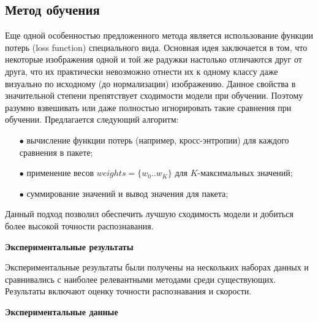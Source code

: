 \subsection{Метод обучения}

Еще одной особенностью предложенного метода является использование функции потерь (loss function) специального вида. Основная идея заключается в том, что некоторые изображения одной и той же радужки настолько отличаются друг от друга, что их практически невозможно отнести их к одному классу даже визуально по исходному (до нормализации) изображению. Данное свойства в значительной степени препятствует сходимости модели при обучении. Поэтому разумно взвешивать или даже полностью игнорировать такие сравнения при обучении. Предлагается следующий алгоритм:

\begin{enumerate}
	\item[$\bullet$] вычисление функции потерь (например, кросс-энтропии) для каждого сравнения в пакете;
	\item[$\bullet$] применение весов $weights=\lbrace{w_0..w_K}\rbrace$ для $K$-максимальных значений;
	\item[$\bullet$] суммирование значений и вывод значения для пакета;
\end{enumerate}

Данный подход позволил обеспечить лучшую сходимость модели и добиться более высокой точности распознавания.

{\bf Экспериментальные результаты}
\label{sec:fem-nn-exp-results}

Экспериментальные результаты были получены на нескольких наборах данных и сравнивались с наиболее релевантными методами среди существующих. Результаты включают оценку точности распознавания и скорости.

{\bf Экспериментальные данные}
\label{sec:fem-nn-exp-data}

